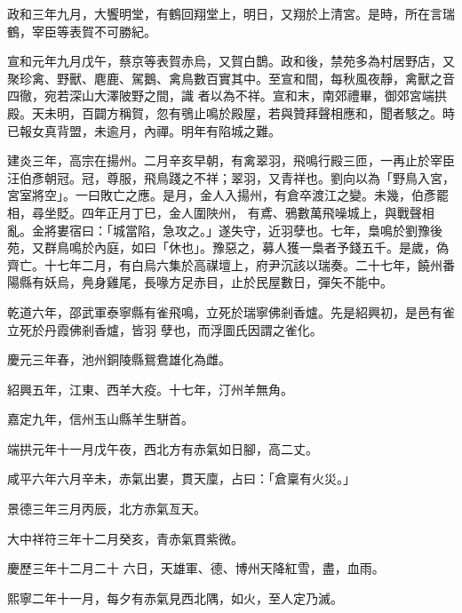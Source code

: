 \begin{pinyinscope}
 政和三年九月，大饗明堂，有鶴回翔堂上，明日，又翔於上清宮。是時，所在言瑞鶴，宰臣等表賀不可勝紀。



 宣和元年九月戊午，蔡京等表賀赤烏，又賀白鵲。政和後，禁苑多為村居野店，又聚珍禽、野獸、麀鹿、駕鵝、禽鳥數百實其中。至宣和間，每秋風夜靜，禽獸之音四徹，宛若深山大澤陂野之間，識
 者以為不祥。宣和末，南郊禮畢，御郊宮端拱殿。天未明，百闢方稱賀，忽有鴞止鳴於殿屋，若與贊拜聲相應和，聞者駭之。時已報女真背盟，未逾月，內禪。明年有陷城之難。



 建炎三年，高宗在揚州。二月辛亥早朝，有禽翠羽，飛鳴行殿三匝，一再止於宰臣汪伯彥朝冠。冠，尊服，飛鳥踐之不祥；翠羽，又青祥也。劉向以為「野鳥入宮，宮室將空」。一曰敗亡之應。是月，金人入揚州，有倉卒渡江之變。未幾，伯彥罷相，尋坐貶。四年正月丁巳，金人圍陜州，
 有鳶、鴉數萬飛噪城上，與戰聲相亂。金將婁宿曰：「城當陷，急攻之。」遂失守，近羽孽也。七年，梟鳴於劉豫後苑，又群鳥鳴於內庭，如曰「休也」。豫惡之，募人獲一梟者予錢五千。是歲，偽齊亡。十七年二月，有白烏六集於高禖壇上，府尹沉該以瑞奏。二十七年，饒州番陽縣有妖烏，鳧身雞尾，長喙方足赤目，止於民屋數日，彈矢不能中。



 乾道六年，邵武軍泰寧縣有雀飛鳴，立死於瑞寧佛剎香爐。先是紹興初，是邑有雀立死於丹霞佛剎香爐，皆羽
 孽也，而浮圖氏因謂之雀化。



 慶元三年春，池州銅陵縣鴛鴦雄化為雌。



 紹興五年，江東、西羊大疫。十七年，汀州羊無角。



 嘉定九年，信州玉山縣羊生駢首。



 端拱元年十一月戊午夜，西北方有赤氣如日腳，高二丈。



 咸平六年六月辛未，赤氣出婁，貫天廩，占曰：「倉稟有火災。」



 景德三年三月丙辰，北方赤氣亙天。



 大中祥符三年十二月癸亥，青赤氣貫紫微。



 慶歷三年十二月二十
 六日，天雄軍、德、博州天降紅雪，盡，血雨。



 熙寧二年十一月，每夕有赤氣見西北隅，如火，至人定乃滅。




\end{pinyinscope}
